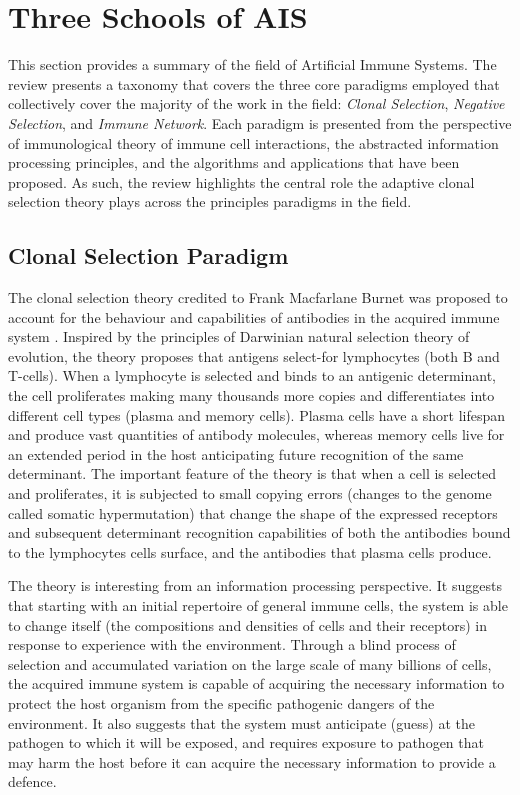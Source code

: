 %
%
\section{Three Schools of AIS}
\label{sec:background:threeschools}
This section provides a summary of the field of Artificial Immune Systems. The review presents a taxonomy that covers the three core paradigms employed that collectively cover the majority of the work in the field: \emph{Clonal Selection}, \emph{Negative Selection}, and \emph{Immune Network}. Each paradigm is presented from the perspective of immunological theory of immune cell interactions, the abstracted information processing principles, and the algorithms and applications that have been proposed. 
As such, the review highlights the central role the adaptive clonal selection theory plays across the principles paradigms in the field.

%
%
\subsection{Clonal Selection Paradigm}
\label{subsec:background:clonalselection}
The clonal selection theory credited to Frank Macfarlane Burnet was proposed to account for the behaviour and capabilities of antibodies in the acquired immune system \cite{Burnet1957, Burnet1959}. Inspired by the principles of Darwinian natural selection theory of evolution, the theory proposes that antigens select-for lymphocytes (both B and T-cells). When a lymphocyte is selected and binds to an antigenic determinant, the cell proliferates making many thousands more copies and differentiates into different cell types (plasma and memory cells). Plasma cells have a short lifespan and produce vast quantities of antibody molecules, whereas memory cells live for an extended period in the host anticipating future recognition of the same determinant. The important feature of the theory is that when a cell is selected and proliferates, it is subjected to small copying errors (changes to the genome called somatic hypermutation) that change the shape of the expressed receptors and subsequent determinant recognition capabilities of both the antibodies bound to the lymphocytes cells surface, and the antibodies that plasma cells produce. 

The theory is interesting from an information processing perspective. It suggests that starting with an initial repertoire of general immune cells, the system is able to change itself (the compositions and densities of cells and their receptors) in response to experience with the environment. Through a blind process of selection and accumulated variation on the large scale of many billions of cells, the acquired immune system is capable of acquiring the necessary information to protect the host organism from the specific pathogenic dangers of the environment. It also suggests that the system must anticipate (guess) at the pathogen to which it will be exposed, and requires exposure to pathogen that may harm the host before it can acquire the necessary information to provide a defence.


